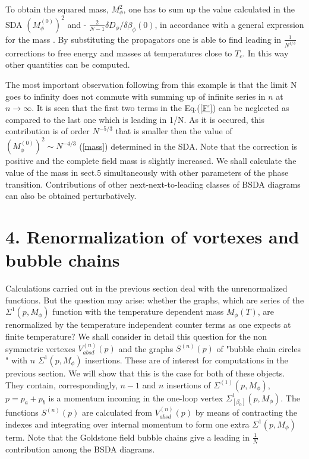 \documentclass[a4paper,12pt]{article}
\begin{document}
To obtain the squared mass, $M_{\phi}^2$, one has to sum up the value
calculated in the SDA $(M_{\phi}^{(0)})^2$ and - $\frac{2}{N - 1}
\delta D_{\phi}/\delta \beta_\phi(0)$, in accordance with a general
expression for the mass \cite{prd}. By substituting the propagators
one is able to find leading in $\frac{1}{N^{1/3}}$ corrections to free
energy and masses at temperatures close to $T_c$. In this way other
quantities can be computed.

The most important observation following from this example is that the
limit N goes to infinity does not commute with summing up of infinite
series in $n$ at $ n \rightarrow \infty$. It is seen that the first
two  terms in the Eq.(\ref{F'}) can be neglected as compared to the
last one which is leading in 1/N.  As it is occured, this contribution
is of order $N^{-5/3}$  that is smaller then the value of
$(M^{(0)}_{\phi})^2 \sim N^{- 4/3}$ (\ref{mass}) determined in  the
SDA. Note that
the correction is positive and the complete field mass is slightly
increased. We shall calculate the  value of the mass in sect.5
simultaneously with other parameters of the phase transition.
 Contributions of other next-next-to-leading classes of BSDA diagrams
 can also be obtained perturbatively.

\section*{4. Renormalization of  vortexes and  bubble chains}
Calculations carried out in the previous section deal with the
unrenormalized functions. But the question may arise: whether the
graphs, which are series of the $\Sigma^{1} (p, M_{\phi}) $ function
with the temperature dependent mass $M_{\phi}(T)$, are renormalized by
the temperature independent counter terms as one expects at finite
temperature? We shall consider in detail this question for the non
symmetric vertexes $V^{(n)}_{absd}(p)$ and the graphs $S^{(n)}(p)$ of
"bubble chain circles " with $n$ $\Sigma^{1} (p, M_{\phi}) $
insertions. These are of interest for computations in the previous
section. We will show that this is the case for both of these
objects. They contain, correspondingly, $n-1$ and $n$ insertions of
$\Sigma^{(1)} (p, M_{\phi}) $, $p = p_a + p_b$ is a momentum incoming
in the one-loop vertex $\Sigma^{1}_{[\beta_0]} (p, M_{\phi}) $. The
functions $S^{(n)}(p)$ are calculated from $V^{(n)}_{absd}(p)$ by
means of contracting the indexes and integrating over internal
momentum to form one extra $\Sigma^{1} (p, M_{\phi}) $ term. Note that
the Goldstone field bubble chains give a leading in $\frac{1}{N}$
contribution among the BSDA diagrams.
 
\end{document}
